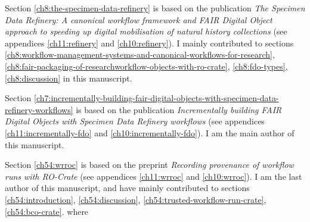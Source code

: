Section \ref{ch8:the-specimen-data-refinery} is based on the publication \emph{The Specimen Data Refinery: A
canonical workflow framework and FAIR Digital Object approach to speeding up digital mobilisation of natural history collections} \cite{Hardisty 2022} (see appendices \ref{ch11:refinery} and \ref{ch10:refinery}). I mainly contributed to sections \ref{ch8:workflow-management-systems-and-canonical-workflows-for-research}, \ref{ch8:fair-packaging-of-researchworkflow-objects-with-ro-crate}, \ref{ch8:fdo-types}, \ref{ch8:discussion} in this manuscript.

Section \ref{ch7:incrementally-building-fair-digital-objects-with-specimen-data-refinery-workflows} is based on the publication \emph{Incrementally building FAIR Digital Objects with Specimen Data
Refinery workflows} \cite{Woolland 2022} (see appendices \ref{ch11:incrementally-fdo} and \ref{ch10:incrementally-fdo}). I am the main author of this manuscript.

Section \ref{ch54:wrroc} is based on the preprint \emph{
Recording provenance of workflow runs with RO-Crate} \cite{workflow-run-crate} (see appendices \ref{ch11:wrroc} and \ref{ch10:wrroc}). I am the last author of this manuscript, and have mainly contributed to sections \ref{ch54:introduction}, \ref{ch54:discussion}, \ref{ch54:trusted-workflow-run-crate}, \ref{ch54:bco-crate}.
where